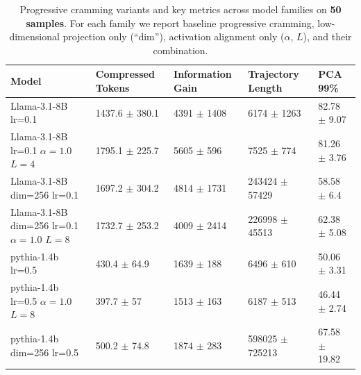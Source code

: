 \begin{table}[]
    \centering
    \caption{Progressive cramming variants and key metrics across model families on \textbf{50 samples}. For each family we report baseline progressive cramming, low-dimensional projection only (``dim''), activation alignment only ($\alpha$, $L$), and their combination.}
    \label{tab:rebuttle_all_progressive_modifications}

    \begin{small}
    \begin{tabular}{lllll}
        \hline
         Model                                                               & Compressed Tokens           & Information Gain         & Trajectory Length         & PCA 99\%                  \\
        \hline
             Llama-3.1-8B {\small lr=0.1}                                                       & 1437.6 {\small $\pm$ 380.1} & 4391 {\small $\pm$ 1408} & 6174 {\small $\pm$ 1263}      & 82.78 {\small $\pm$ 9.07}  \\
     Llama-3.1-8B {\small lr=0.1} {\small $\alpha=1.0$} {\small $L=4$}                  & 1795.1 {\small $\pm$ 225.7} & 5605 {\small $\pm$ 596}  & 7525 {\small $\pm$ 774}       & 81.26 {\small $\pm$ 3.76}  \\
     Llama-3.1-8B {\small dim=256} {\small lr=0.1}                                      & 1697.2 {\small $\pm$ 304.2} & 4814 {\small $\pm$ 1731} & 243424 {\small $\pm$ 57429}   & 58.58 {\small $\pm$ 6.4}   \\
     Llama-3.1-8B {\small dim=256} {\small lr=0.1} {\small $\alpha=1.0$} {\small $L=8$} & 1732.7 {\small $\pm$ 253.2} & 4009 {\small $\pm$ 2414} & 226998 {\small $\pm$ 45513}   & 62.38 {\small $\pm$ 5.08}  \\
     \midrule
     pythia-1.4b {\small lr=0.5}                                                        & 430.4 {\small $\pm$ 64.9}   & 1639 {\small $\pm$ 188}  & 6496 {\small $\pm$ 610}       & 50.06 {\small $\pm$ 3.31}  \\
     pythia-1.4b {\small lr=0.5} {\small $\alpha=1.0$} {\small $L=8$}                   & 397.7 {\small $\pm$ 57}     & 1513 {\small $\pm$ 163}  & 6187 {\small $\pm$ 513}       & 46.44 {\small $\pm$ 2.74}  \\
     pythia-1.4b {\small dim=256} {\small lr=0.5}                                       & 500.2 {\small $\pm$ 74.8}   & 1874 {\small $\pm$ 283}  & 598025 {\small $\pm$ 725213}  & 67.58 {\small $\pm$ 19.82} \\

\end{tabular}
\end{small}
\end{table}
